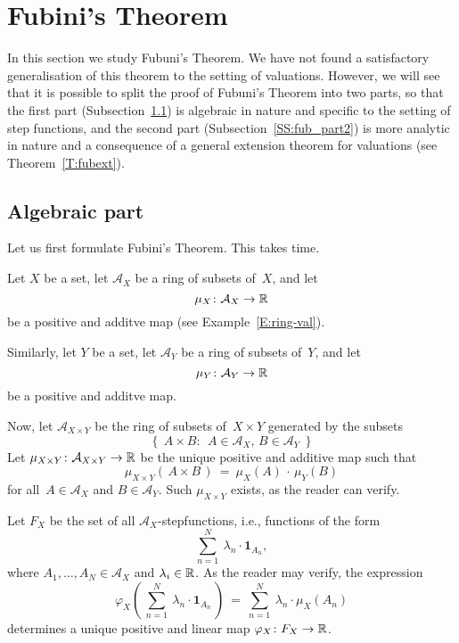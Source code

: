 \documentclass[main.tex]{subfiles}
\begin{document}
\section{Fubini's Theorem}
\label{S:fub}
In this section we study Fubuni's Theorem.
We have not found a satisfactory generalisation of this theorem
to the setting of valuations.
However,
we will see that it is possible to split
the proof of Fubuni's Theorem
into two parts,
so that the first part (Subsection~\ref{SS:fub_part1})
is algebraic in nature
and specific to the setting of step functions,
and the second part (Subsection~\ref{SS:fub_part2}) is more analytic in nature
and a consequence of a
general extension theorem for valuations (see Theorem~\ref{T:fubext}).

\subsection{Algebraic part}
\label{SS:fub_part1}
Let us first formulate Fubini's Theorem.
This takes time.

Let $X$ be a set,
let $\mathcal{A}_X$ be a ring of subsets of~$X$,
and let 
\begin{equation*}
\mu_X\colon \mathcal{A}_X \rightarrow \mathbb{R}
\end{equation*}
be a positive and additve map
(see Example~\ref{E:ring-val}).

Similarly, let $Y$ be a set,
let $\mathcal{A}_Y$ be a ring of subsets of~$Y$,
and let 
\begin{equation*}
\mu_Y\colon \mathcal{A}_Y \rightarrow \mathbb{R}
\end{equation*}
be a positive and additve map.

Now, let $\mathcal{A}_{X\times Y}$
be the ring of subsets of~$X\times Y$
generated by the subsets
\begin{equation*}
\{\ \  A \times B\colon\ \  \text{$A\in \mathcal{A}_X$, \ \ 
 $B\in\mathcal{A}_Y$} \ \ \}
\end{equation*}
Let $\mu_{X\times Y} \colon \mathcal{A}_{X\times Y} \rightarrow \mathbb{R}$
be the unique positive and additive map such that
\begin{equation*}
\mu_{X\times Y} (\,A\times B\,)
\ =\ \mu_X(A)\,\cdot\,\mu_Y(B)
\end{equation*}
for all~$A\in\mathcal{A}_X$ and $B\in\mathcal{A}_Y$.
Such $\mu_{X\times Y}$ exists,
as the reader can verify.

Let $F_X$ be the set of all $\mathcal{A}_X$-stepfunctions,
i.e., functions of the form
\begin{equation*}
\textstyle{\sum_{n=1}^N \ \lambda_n \cdot \mathbf{1}_{A_n}  },
\end{equation*}
where $A_1,\dotsc,A_N \in\mathcal{A}_X$
and $\lambda_i \in \mathbb{R}$.
As the reader may verify,
the expression
\begin{equation*}
\varphi_X(\,\textstyle{\sum_{n=1}^N \ \lambda_n \cdot \mathbf{1}_{A_n}}\,)
\ =\ \textstyle{\sum_{n=1}^N \ \lambda_n \cdot \mu_X (A_n)}
\end{equation*}
determines a unique positive and linear
map $\varphi_X\colon F_X \rightarrow \mathbb{R}$. 
\end{document}
